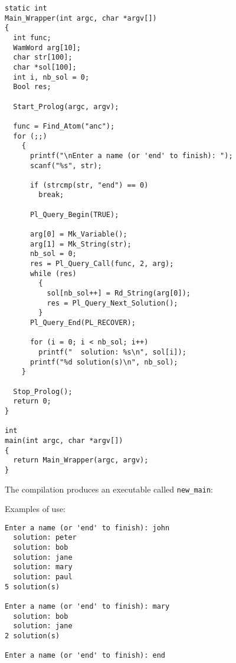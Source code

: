 \begin{Indentation}
\begin{verbatim}
static int
Main_Wrapper(int argc, char *argv[])
{
  int func;
  WamWord arg[10];
  char str[100];
  char *sol[100];
  int i, nb_sol = 0;
  Bool res;

  Start_Prolog(argc, argv);

  func = Find_Atom("anc");
  for (;;)
    {
      printf("\nEnter a name (or 'end' to finish): ");
      scanf("%s", str);

      if (strcmp(str, "end") == 0)
        break;

      Pl_Query_Begin(TRUE);

      arg[0] = Mk_Variable();
      arg[1] = Mk_String(str);
      nb_sol = 0;
      res = Pl_Query_Call(func, 2, arg);
      while (res)
        {
          sol[nb_sol++] = Rd_String(arg[0]);
          res = Pl_Query_Next_Solution();
        }
      Pl_Query_End(PL_RECOVER);

      for (i = 0; i < nb_sol; i++)
        printf("  solution: %s\n", sol[i]);
      printf("%d solution(s)\n", nb_sol);
    }

  Stop_Prolog();
  return 0;
}

int
main(int argc, char *argv[])
{
  return Main_Wrapper(argc, argv);
}
\end{verbatim}
\end{Indentation}

The compilation produces an executable called \texttt{new\_main}:


Examples of use:

\begin{Indentation}
\begin{verbatim}
Enter a name (or 'end' to finish): john
  solution: peter
  solution: bob
  solution: jane
  solution: mary
  solution: paul
5 solution(s)

Enter a name (or 'end' to finish): mary
  solution: bob
  solution: jane
2 solution(s)

Enter a name (or 'end' to finish): end
\end{verbatim}
\end{Indentation}


